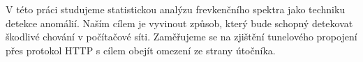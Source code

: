 V této práci studujeme  statistickou analýzu frevkenčního spektra jako techniku detekce anomálií. Naším cílem je vyvinout způsob, který bude schopný detekovat škodlivé chování v počítačové síti. Zaměřujeme se na zjištění tunelového propojení přes protokol HTTP s cílem obejít omezení ze strany útočníka.